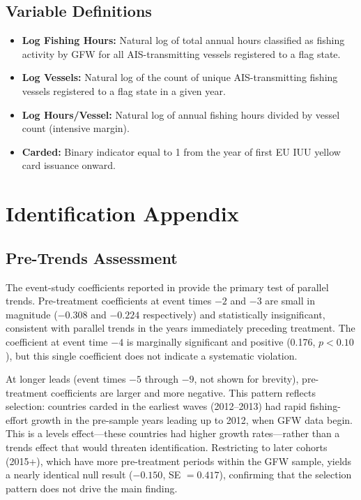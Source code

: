 \documentclass[12pt]{article}
\begin{document}
\subsection{Variable Definitions}

\begin{itemize}
\item \textbf{Log Fishing Hours:} Natural log of total annual hours classified as fishing activity by GFW for all AIS-transmitting vessels registered to a flag state.
\item \textbf{Log Vessels:} Natural log of the count of unique AIS-transmitting fishing vessels registered to a flag state in a given year.
\item \textbf{Log Hours/Vessel:} Natural log of annual fishing hours divided by vessel count (intensive margin).
\item \textbf{Carded:} Binary indicator equal to 1 from the year of first EU IUU yellow card issuance onward.
\end{itemize}


\section{Identification Appendix}
\label{app:identification}

\subsection{Pre-Trends Assessment}

The event-study coefficients reported in  provide the primary test of parallel trends. Pre-treatment coefficients at event times $-2$ and $-3$ are small in magnitude ($-0.308$ and $-0.224$ respectively) and statistically insignificant, consistent with parallel trends in the years immediately preceding treatment. The coefficient at event time $-4$ is marginally significant and positive (0.176, $p < 0.10$), but this single coefficient does not indicate a systematic violation.

At longer leads (event times $-5$ through $-9$, not shown for brevity), pre-treatment coefficients are larger and more negative. This pattern reflects selection: countries carded in the earliest waves (2012--2013) had rapid fishing-effort growth in the pre-sample years leading up to 2012, when GFW data begin. This is a levels effect---these countries had higher growth rates---rather than a trends effect that would threaten identification. Restricting to later cohorts (2015+), which have more pre-treatment periods within the GFW sample, yields a nearly identical null result ($-0.150$, SE $= 0.417$), confirming that the selection pattern does not drive the main finding.
\end{document}
